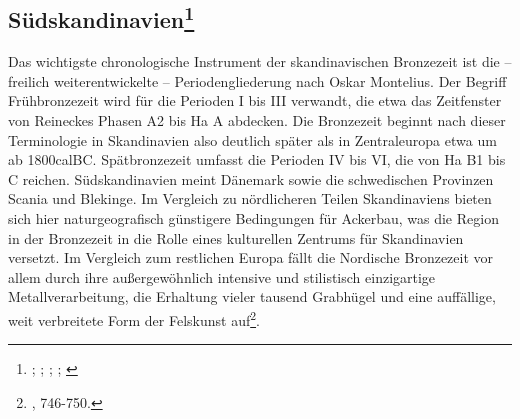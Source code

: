 \documentclass[openany,twoside,twocolumn]{book}
\let\rmarkdownfootnote\footnote%
\def\footnote{\protect\rmarkdownfootnote}
\begin{document}
\hypertarget{sudskandinavien}{%
\subsection[Südskandinavien]{\texorpdfstring{Südskandinavien\footnote{\textcite{ambrosiani_bronzezeit_1986};
  \textcite{levy_heterarchy_1995}; \textcite{thrane_scandinavia_2013};
  \textcite{victor_med_2002}; \textcite{wrigglesworth_bronze_2007}}}{Südskandinavien}}\label{sudskandinavien}}

Das wichtigste chronologische Instrument der skandinavischen Bronzezeit
ist die -- freilich weiterentwickelte -- Periodengliederung nach Oskar
Montelius. Der Begriff Frühbronzezeit wird für die Perioden I bis III
verwandt, die etwa das Zeitfenster von Reineckes Phasen A2 bis Ha A
abdecken. Die Bronzezeit beginnt nach dieser Terminologie in
Skandinavien also deutlich später als in Zentraleuropa etwa um ab
1800calBC. Spätbronzezeit umfasst die Perioden IV bis VI, die von Ha B1
bis C reichen. Südskandinavien meint Dänemark sowie die schwedischen
Provinzen Scania und Blekinge. Im Vergleich zu nördlicheren Teilen
Skandinaviens bieten sich hier naturgeografisch günstigere Bedingungen
für Ackerbau, was die Region in der Bronzezeit in die Rolle eines
kulturellen Zentrums für Skandinavien versetzt. Im Vergleich zum
restlichen Europa fällt die Nordische Bronzezeit vor allem durch ihre
außergewöhnlich intensive und stilistisch einzigartige
Metallverarbeitung, die Erhaltung vieler tausend Grabhügel und eine
auffällige, weit verbreitete Form der Felskunst auf\footnote{\textcite{thrane_scandinavia_2013},
  746-750.}.
\end{document}
